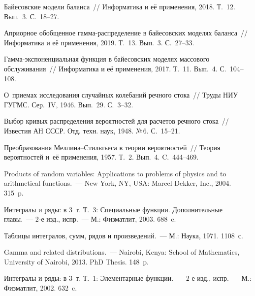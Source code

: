 \begin{multicols}{2}
{\small\frenchspacing
{%
\begin{thebibliography}{99}

Байесовские модели баланса~// Информатика и её применения, 2018. Т.~12. Вып.~3. С.~18--27.

Априорное обобщенное гам\-ма-рас\-пре\-де\-ле\-ние в байесовских моделях баланса~// 
Информатика и её применения, 2019. Т.~13. Вып.~3. С.~27--33.

Гам\-ма-экс\-по\-нен\-ци\-аль\-ная функция в байесовских моделях массового обслуживания~// 
Информатика и её применения, 2017. Т.~11. Вып.~4. С.~104--108.

О~приемах исследования случайных колебаний речного стока~// 
Труды НИУ ГУГМС. Сер.~IV, 1946. Вып.~29. С.~3--32.

Выбор кривых распределения вероятностей для расчетов речного стока~// 
Известия АН СССР. Отд. техн. наук, 1948. №\,6. С.~15--21.

Преобразования Мел\-ли\-на--Стильть\-еса в теории вероятностей~// 
Теория вероятностей и~её применения, 1957. Т.~2. Вып.~4. C.~444--469.

Products of random variables: Applications to problems of physics and to arithmetical functions.~--- 
New York, NY, USA: Marcel Dekker, Inc., 2004. 315~p.

Интегралы и ряды: в 3~т. Т.~3: Специальные функции. Дополнительные главы.~--- 
2-е изд., испр.~--- М.: Физматлит, 2003. 688~c.

Таблицы интегралов, сумм, рядов и произведений.~--- М.: Наука, 1971. 1108~с.

Gamma and related distributions.~--- Nairobi, Kenya: 
School of Mathematics, University of Nairobi, 2013. PhD Thesis. 148~p. 

Интегралы и ряды: в 3~т. Т.~1: Элементарные функции.~--- 2-е изд., испр.~--- М.: Физматлит, 2002. 632~c.
\end{thebibliography}

}
}

\end{multicols}

